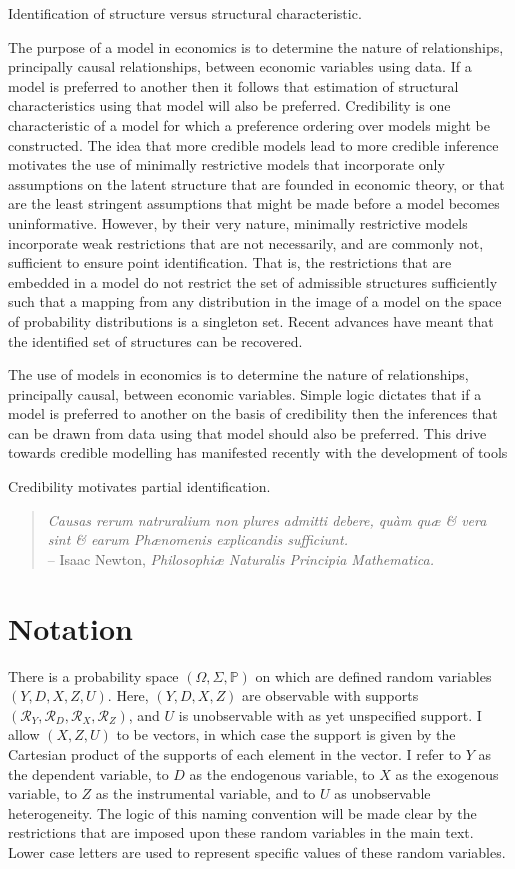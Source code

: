 \documentclass[10pt,a4paper,twoside]{article}
\numberwithin{equation}{subsection}
\begin{document}
Identification of structure versus structural characteristic.

The purpose of a model in economics is to determine the nature of relationships, principally causal relationships, between economic variables using data. If a model is preferred to another then it follows that estimation of structural characteristics using that model will also be preferred. Credibility is one characteristic of a model for which a preference ordering over models might be constructed. The idea that more credible models lead to more credible inference motivates the use of minimally restrictive models that incorporate only assumptions on the latent structure that are founded in economic theory, or that are the least stringent assumptions that might be made before a model becomes uninformative. However, by their very nature, minimally restrictive models incorporate weak restrictions that are not necessarily, and are commonly not, sufficient to ensure point identification. That is, the restrictions that are embedded in a model do not restrict the set of admissible structures sufficiently such that a mapping from any distribution in the image of a model on the space of probability distributions is a singleton set. Recent advances have meant that the identified set of structures can be recovered.  

The use of models in economics is to determine the nature of relationships, principally causal, between economic variables. Simple logic dictates that if a model is preferred to another on the basis of credibility then the inferences that can be drawn from data using that model should also be preferred. This drive towards credible modelling has manifested recently with the development of tools 

Credibility motivates partial identification. 
\begin{quote}
\textit{Causas rerum natruralium non plures admitti debere, qu{\`{a}}m qu{\ae} \& vera sint \& earum Ph{\ae}nomenis explicandis sufficiunt.}\\ 
\vspace{10pt}
\--- Isaac Newton, \textit{Philosophi{\ae} Naturalis Principia Mathematica.}
\end{quote}
\section*{Notation}
There is a probability space $(\Omega,\Sigma,\mathbb{P})$ on which are defined random variables $(Y,D,X,Z,U)$. Here, $(Y,D,X,Z)$ are observable with supports $(\mathcal{R}_Y,\mathcal{R}_D,\mathcal{R}_X,\mathcal{R}_Z)$, and $U$ is unobservable with as yet unspecified support. I allow $(X,Z,U)$ to be vectors, in which case the support is given by the Cartesian product of the supports of each element in the vector. I refer to $Y$ as the dependent variable, to $D$ as the endogenous variable, to $X$ as the exogenous variable, to $Z$ as the instrumental variable, and to $U$ as unobservable heterogeneity. The logic of this naming convention will be made clear by the restrictions that are imposed upon these random variables in the main text. Lower case letters are used to represent specific values of these random variables.
\end{document}
